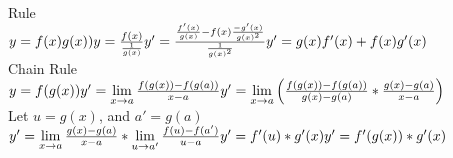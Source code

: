 \documentclass[12pt]{article}
\begin{document}
Rule\\$y=f(x)g(x))\\y=\frac{f(x)}{\frac{1}{g(x)}}\\y'=\frac{\frac{f'(x)}{g(x)}-f(x)\frac{-g'(x)}{g(x)^2}}{\frac{1}{g(x)^2}}\\y'=g(x)f'(x)+f(x)g'(x)$\\Chain Rule\\$y=f(g(x))\\y'=\lim\limits_{x \to a} \frac{f(g(x))-f(g(a))}{x-a}\\y'=\lim\limits_{x \to a}\Big( \frac{f(g(x))-f(g(a))}{g(x)-g(a)}*\frac{g(x)-g(a)}{x-a}\Big)$\\Let $u=g(x)$, and $a'=g(a)$\\$y'=\lim\limits_{x \to a} \frac{g(x)-g(a)}{x-a}*\lim\limits_{u \to a'} \frac{f(u)-f(a')}{u-a}\\y'=f'(u)*g'(x)\\y'=f'(g(x))*g'(x)$
\end{document}

